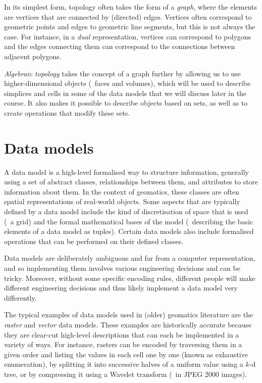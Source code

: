 \begin{description}
In its simplest form, topology often takes the form of a \emph{graph}, where the elements are vertices that are connected by (directed) edges.
Vertices often correspond to geometric points and edges to geometric line segments, but this is not always the case.
For instance, in a \emph{dual} representation, vertices can correspond to polygons and the edges connecting them can correspond to the connections between adjacent polygons.

\emph{Algebraic topology} takes the concept of a graph further by allowing us to use higher-dimensional objects (\eg\ faces and volumes), which will be used to describe simplices and cells in some of the data models that we will discuss later in the course.
It also makes it possible to describe objects based on sets, as well as to create operations that modify these sets.


\end{description}

\section{Data models}

A data model is a high-level formalised way to structure information, generally using a set of abstract classes, relationships between them, and attributes to store information about them.
In the context of geomatics, these classes are often spatial representations of real-world objects.
Some aspects that are typically defined by a data model include the kind of discretisation of space that is used (\eg\ a grid) and the formal mathematical bases of the model (\eg\ describing the basic elements of a data model as tuples).
Certain data models also include formalised operations that can be performed on their defined classes.

Data models are deliberately ambiguous and far from a computer representation, and so implementing them involves various engineering decisions and can be tricky.
Moreover, without some specific encoding rules, different people will make different engineering decisions and thus likely implement a data model very differently.

The typical examples of data models used in (older) geomatics literature are the \emph{raster} and \emph{vector} data models.
These examples are historically accurate because they are clear-cut high-level descriptions that can each be implemented in a variety of ways.
For instance, rasters can be encoded by traversing them in a given order and listing the values in each cell one by one (known as exhaustive enumeration), by splitting it into successive halves of a uniform value using a $k$-d tree, or by compressing it using a Wavelet transform (\eg\ in JPEG 2000 images).

